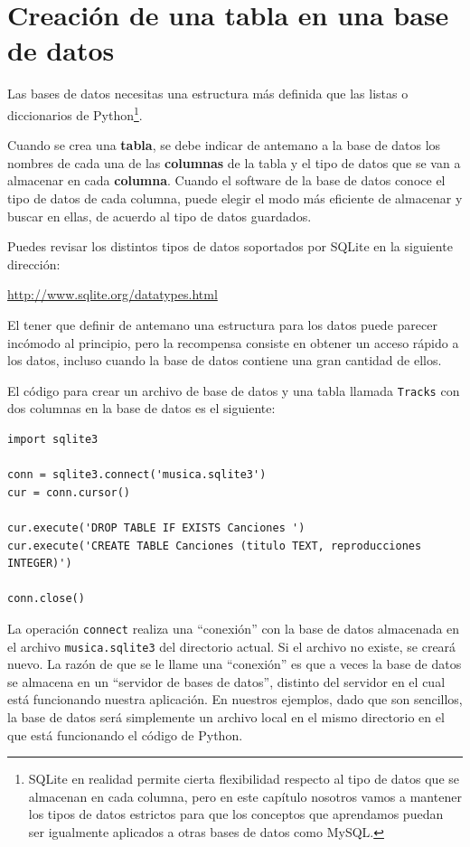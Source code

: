\section{Creación de una tabla en una base de datos}

Las bases de datos necesitas una estructura más definida que las listas
o diccionarios de Python\footnote{SQLite en realidad permite cierta
flexibilidad respecto al tipo de datos que se almacenan en cada columna,
pero en este capítulo nosotros vamos a mantener los tipos de datos estrictos
para que los conceptos que aprendamos puedan ser igualmente aplicados a otras
bases de datos como MySQL.}.

Cuando se crea una {\bf tabla}, se debe
indicar de antemano a la base de datos los nombres de cada una de las
{\bf columnas} de la tabla y el tipo de datos que se van a
almacenar en cada {\bf columna}. Cuando el software de la base de datos
conoce el tipo de datos de cada columna, puede elegir el modo más
eficiente de almacenar y buscar en ellas, de acuerdo al tipo de
datos guardados.

Puedes revisar los distintos tipos de datos soportados por SQLite
en la siguiente dirección:

\url{http://www.sqlite.org/datatypes.html}

El tener que definir de antemano una estructura para los datos puede parecer incómodo
al principio, pero la recompensa consiste en obtener un acceso rápido a los datos,
incluso cuando la base de datos contiene una gran cantidad de ellos.

El código para crear un archivo de base de datos y una tabla
llamada {\tt Tracks} con dos columnas en la
base de datos es el siguiente:

\beforeverb
\begin{verbatim}
import sqlite3

conn = sqlite3.connect('musica.sqlite3')
cur = conn.cursor()

cur.execute('DROP TABLE IF EXISTS Canciones ')
cur.execute('CREATE TABLE Canciones (titulo TEXT, reproducciones INTEGER)')

conn.close()
\end{verbatim}
\afterverb
%
La operación {\tt connect} realiza una ``conexión'' con la base de datos
almacenada en el archivo {\tt musica.sqlite3} del directorio actual. Si
el archivo no existe, se creará nuevo. La razón de que se le
llame una ``conexión'' es que a veces la base de datos se almacena en
un ``servidor de bases de datos'', distinto del servidor en el cual está
funcionando nuestra aplicación. En nuestros ejemplos, dado que son sencillos,
la base de datos será simplemente un archivo local en el mismo directorio
en el que está funcionando el código de Python.


